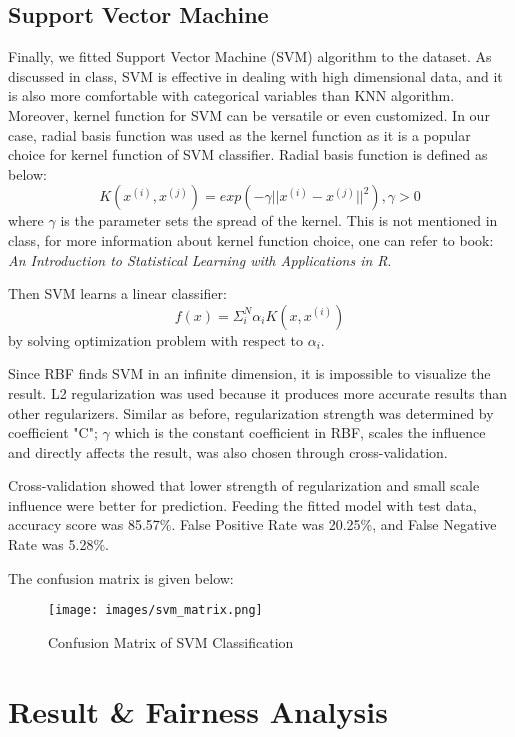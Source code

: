 \documentclass[letterpaper, 10 pt, conference]{ieeeconf}  %
\begin{document}
\subsection{Support Vector Machine}
Finally, we fitted Support Vector Machine (SVM) algorithm to the dataset. As discussed in class, SVM is effective in dealing with high dimensional data, and it is also more comfortable with categorical variables than KNN algorithm. Moreover, kernel function for SVM can be versatile or even customized. In our case, radial basis function was used as the kernel function as it is a popular choice for kernel function of SVM classifier. Radial basis function is defined as below:
\begin{equation}
    K(x^{(i)}, x^{(j)}) = exp(-\gamma||x^{(i)}-x^{(j)}||^2), \gamma > 0
\end{equation}
where $\gamma$ is the parameter sets the spread of the kernel. This is not mentioned in class, for more information about kernel function choice, one can refer to book: \textit{An Introduction to Statistical Learning with Applications in R}\cite{c4}.

Then SVM learns a linear classifier:
\begin{equation}
    f(x) = \Sigma_i^N\alpha_iK(x, x^{(i)})
\end{equation}
by solving optimization problem with respect to $\alpha_i$.


Since RBF finds SVM in an infinite dimension, it is impossible to visualize the result. L2 regularization was used because it produces more accurate results than other regularizers. Similar as before, regularization strength was determined by coefficient "C"; $\gamma$ which is the constant coefficient in RBF, scales the influence and directly affects the result, was also chosen through cross-validation.

Cross-validation showed that lower strength of regularization and small scale influence were better for prediction. Feeding the fitted model with test data, accuracy score was 85.57\%. False Positive Rate was 20.25\%, and False Negative Rate was 5.28\%.

The confusion matrix is given below:
\begin{figure}[H]
    \centering
    \texttt{[image: images/svm\_matrix.png]}
    \caption{Confusion Matrix of SVM Classification}
\end{figure}

\section{Result \& Fairness Analysis}
\end{document}
